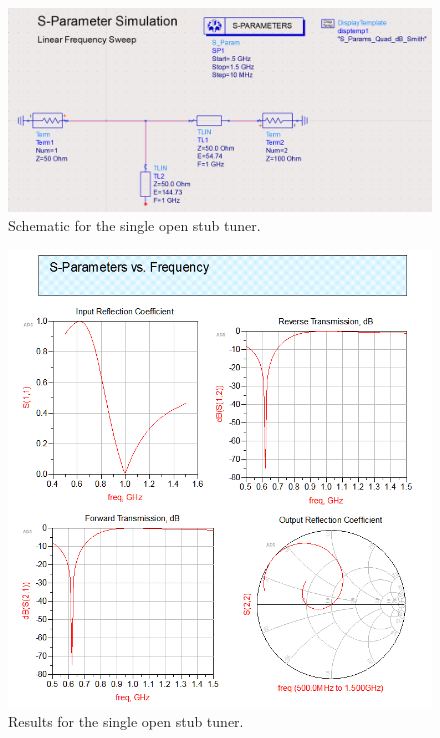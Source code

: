 



\begin{figure}[h]
    \centering
    \includegraphics[width=0.8\linewidth]{res/ADS/SingleOpenStubSchematic.png}
    \caption{Schematic for the single open stub tuner.}
    \label{fig:}
\end{figure}
\begin{figure}[h]
    \centering
    \includegraphics[width=0.8\linewidth]{res/ADS/SingleOpenStub.png}
    \caption{Results for the single open stub tuner.}
    \label{fig:}
\end{figure}

